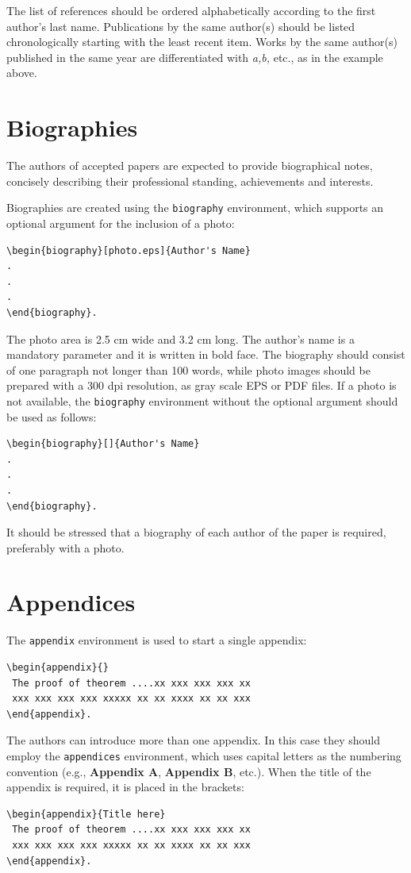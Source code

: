 \documentclass{amcs}
\begin{document}
The list of references should be ordered alphabetically according to the first author's last name. Publications by the same author(s) should be listed chronologically starting with the least recent item. Works by the same author(s) published in the same year are differentiated with \emph{a,b,} etc., as in the example above.

\section{Biographies}
The authors of accepted papers are expected to provide biographical notes, concisely describing their professional standing, achievements and interests.

Biographies are created using the \texttt{biography}
environment, which supports an optional argument for
the inclusion of a photo:
{\small\begin{verbatim}
\begin{biography}[photo.eps]{Author's Name}
.
.
.
\end{biography}.
\end{verbatim}}

The photo area is 2.5 cm wide and 3.2 cm long. The author's name is a mandatory parameter and it is written in bold face. The biography should consist of one paragraph not longer than 100 words, while photo images should be prepared with a 300 dpi resolution, as gray scale EPS or PDF files. If a photo is not available, the \verb+biography+ environment without the optional argument should be used as follows:
{\small\begin{verbatim}
\begin{biography}[]{Author's Name}
.
.
.
\end{biography}.
\end{verbatim}}

It should be stressed that a biography of each author of the paper is required, preferably with a photo.

\section{Appendices}

The \verb+appendix+ environment is used to start a single appendix:
{\small \begin{verbatim}
\begin{appendix}{}
 The proof of theorem ....xx xxx xxx xxx xx
 xxx xxx xxx xxx xxxxx xx xx xxxx xx xx xxx
\end{appendix}.
\end{verbatim}}
The authors can introduce more than one appendix. In this case they should employ the \verb+appendices+ environment, which uses capital letters as the numbering convention (e.g., \textbf{Appendix A}, \textbf{Appendix B}, etc.). When the title of the appendix is required, it is placed in the brackets:
{\small \begin{verbatim}
\begin{appendix}{Title here}
 The proof of theorem ....xx xxx xxx xxx xx
 xxx xxx xxx xxx xxxxx xx xx xxxx xx xx xxx
\end{appendix}.
\end{verbatim}}
\end{document}
